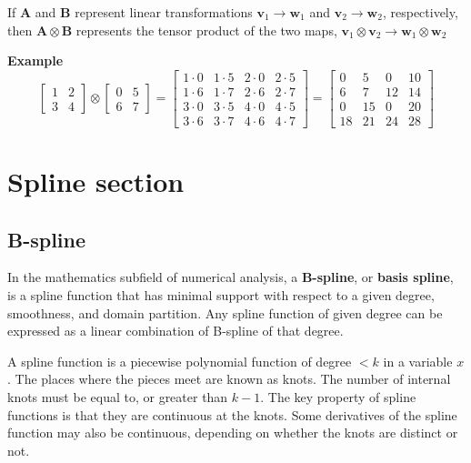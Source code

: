If $ \mathbf{A} $ and $ \mathbf{B} $ represent linear transformations $ \mathbf{v}_1 \rightarrow \mathbf{w}_1 $ and $ \mathbf{v}_2 \rightarrow \mathbf{w}_2 $, respectively, then $ \mathbf{A} \otimes \mathbf{B} $ represents the tensor product of the two maps, $ \mathbf{v}_1 \otimes \mathbf{v}_2 \rightarrow \mathbf{w}_1 \otimes \mathbf{w}_2 $

\textbf{Example}
\begin{equation}
\begin{bmatrix}
1 & 2\\3 & 4
\end{bmatrix} \otimes \begin{bmatrix}
0 & 5\\
6 & 7
\end{bmatrix} = \begin{bmatrix}
1 \cdot 0 & 1 \cdot 5 & 2 \cdot 0 & 2 \cdot 5\\
1 \cdot 6 & 1 \cdot 7 & 2 \cdot 6 & 2 \cdot 7\\
3 \cdot 0 & 3 \cdot 5 & 4 \cdot 0 & 4 \cdot 5\\
3 \cdot 6 & 3 \cdot 7 & 4 \cdot 6 & 4 \cdot 7
\end{bmatrix} = \begin{bmatrix}
0 & 5 & 0 & 10\\
6 & 7 & 12 & 14\\
0 & 15 & 0 & 20\\
18 & 21 & 24 & 28
\end{bmatrix}
\end{equation}

\section{Spline section}
\subsection{B-spline}
In the mathematics subfield of numerical analysis, a \textbf{B-spline}, or \textbf{basis spline}, is a spline function that has minimal support with respect to a given degree, smoothness, and domain partition. Any spline function of given degree can be expressed as a linear combination of B-spline of that degree.

A spline function is a piecewise polynomial function of degree $ <k $ in a variable $ x $. The places where the pieces meet are known as knots. The number of internal knots must be equal to, or greater than $ k-1 $. The key property of spline functions is that they are continuous at the knots. Some derivatives of the spline function may also be continuous, depending on whether the knots are distinct or not.


